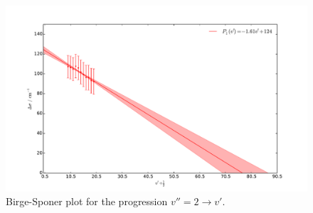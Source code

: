 \begin{figure}
    \centering
    \includegraphics[width=\pltw]{analysis/figures/b_s_2.pdf}
    \caption{Birge-Sponer plot for the progression $v'' = 2 \rightarrow v'$.  
    }
    \label{fig:b_s_2}
\end{figure}


















